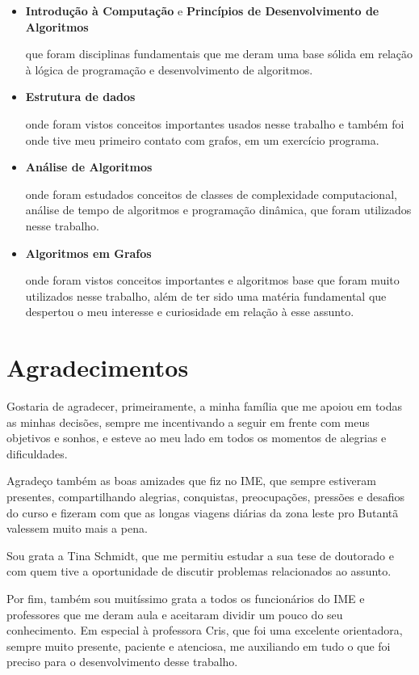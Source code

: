 \documentclass[a4paper,12pt]{article}
\begin{document}
\begin{itemize}
	\item \textbf{Introdução à Computação} e 
	\textbf{Princípios de Desenvolvimento de Algoritmos}


		que foram disciplinas fundamentais que me deram  
		 uma base sólida em relação
		à lógica de programação e desenvolvimento de algoritmos.

	\item \textbf{Estrutura de dados}

		onde foram vistos conceitos importantes usados 
		nesse trabalho e também foi
		onde tive meu primeiro contato com grafos,
		em um exercício programa.
		
	\item \textbf{Análise de Algoritmos}

		onde foram estudados conceitos de classes de complexidade computacional,
		análise de tempo de algoritmos e programação dinâmica, que foram
		utilizados nesse trabalho.

	\item \textbf{Algoritmos em Grafos}
	
		onde foram vistos conceitos importantes e algoritmos 
		base que foram muito utilizados nesse trabalho, 
		além de ter sido uma matéria fundamental que despertou o meu interesse 
		e curiosidade em relação à esse assunto.
\end{itemize}

\newpage

\section{Agradecimentos}
Gostaria de agradecer, primeiramente, a minha família
que me apoiou em todas as minhas decisões, sempre
me incentivando a seguir em frente com meus objetivos e sonhos,
e esteve ao meu lado em todos os momentos de alegrias e dificuldades.

Agradeço também as boas amizades que fiz no IME, que sempre 
estiveram presentes, compartilhando
alegrias, conquistas, preocupações, pressões e desafios do curso
e fizeram com que as longas viagens diárias da zona leste pro Butantã 
valessem muito mais a pena.

Sou grata a Tina Schmidt, que me permitiu estudar a sua tese de doutorado e
com quem tive a oportunidade de discutir problemas relacionados ao assunto.

Por fim, também sou muitíssimo grata a todos os funcionários do IME e professores que
me deram aula e aceitaram dividir um pouco do seu conhecimento.
Em especial à professora Cris, que foi uma excelente orientadora,
sempre muito presente, paciente e atenciosa, me auxiliando em tudo
o que foi preciso para o desenvolvimento desse trabalho.
\end{document}
